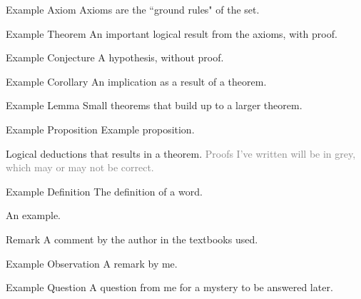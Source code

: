 \documentclass[12pt, english]{book}
\makeatletter
\renewenvironment{proof}[1][\proofname]{\par
	\pushQED{\qed}%
	\normalfont \topsep6\p@\@plus6\p@\relax
	\list{}{%
		\settowidth{\leftmargin}{\itshape\proofname:\hskip\labelsep}%
		\setlength{\labelwidth}{0pt}%
		\setlength{\itemindent}{-\leftmargin}%
		}%
	\item[\hskip\labelsep\itshape#1\@addpunct{:}]\ignorespaces
	}{\popQED\endlist\@endpefalse}
\makeatother
\begin{document}
	\begin{axiom}{Example Axiom}
		Axioms are the ``ground rules" of the set.
	\end{axiom}

	\begin{theorem}{Example Theorem}
		An important logical result from the axioms, with proof.
	\end{theorem}

	\begin{conjecture}{Example Conjecture}
		A hypothesis, without proof.
	\end{conjecture}
	
	\begin{corollary}{Example Corollary}
		An implication as a result of a theorem.
	\end{corollary}

	\begin{lemma}{Example Lemma}
		Small theorems that build up to a larger theorem. 
	\end{lemma}
	
	\begin{proposition}{Example Proposition}
		Example proposition.
	\end{proposition}
	
	\begin{proof}
		Logical deductions that results in a theorem.
		\textcolor{Grey}{Proofs I've written will be in grey, which may or may not be correct.}
	\end{proof}

	\begin{definition}[Word]{Example Definition}
		The definition of a word.
	\end{definition}	

	\begin{example}
		An example.
	\end{example}

	\begin{remark}{Remark}
		A comment by the author in the textbooks used.
	\end{remark}
	
	\begin{observation}{Example Observation}
		A remark by me.
	\end{observation}

	\begin{question}{Example Question}
		A question from me for a mystery to be answered later. 
	\end{question}
\end{document}
